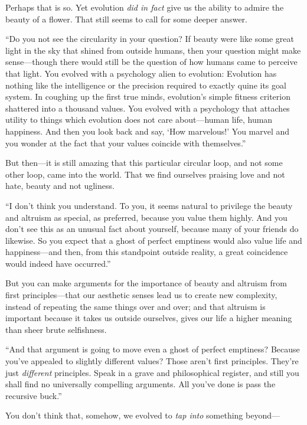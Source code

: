  Perhaps that is so. Yet evolution \textit{did in fact} give us the
ability to admire the beauty of a flower. That still seems to call for
some deeper answer.


 ``Do you not see the circularity in your
question? If beauty were like some great light in the sky that shined
from outside humans, then your question might make sense---though there
would still be the question of how humans came to perceive that light.
You evolved with a psychology alien to evolution: Evolution has nothing
like the intelligence or the precision required to exactly quine its
goal system. In coughing up the first true minds,
evolution's simple fitness criterion shattered into a
thousand values. You evolved with a psychology that attaches utility to
things which evolution does not care about---human life, human
happiness. And then you look back and say, `How
marvelous!' You marvel and you wonder at the fact that
your values coincide with themselves.''


 But then---it is still amazing that this particular circular loop,
and not some other loop, came into the world. That we find ourselves
praising love and not hate, beauty and not ugliness.


 ``I don't think you understand.
To you, it seems natural to privilege the beauty and altruism as
special, as preferred, because you value them highly. And you
don't see this as an unusual fact about yourself,
because many of your friends do likewise. So you expect that a ghost of
perfect emptiness would also value life and happiness---and then, from
this standpoint outside reality, a great coincidence would indeed have
occurred.''


 But you can make arguments for the importance of beauty and
altruism from first principles---that our aesthetic senses lead us to
create new complexity, instead of repeating the same things over and
over; and that altruism is important because it takes us outside
ourselves, gives our life a higher meaning than sheer brute
selfishness.


 ``And that argument is going to move even a ghost
of perfect emptiness? Because you've appealed to
slightly different values? Those aren't first
principles. They're just \textit{different} principles.
Speak in a grave and philosophical register, and still you shall find
no universally compelling arguments. All you've done is
pass the recursive buck.''


 You don't think that, somehow, we evolved to
\textit{tap into} something beyond---


